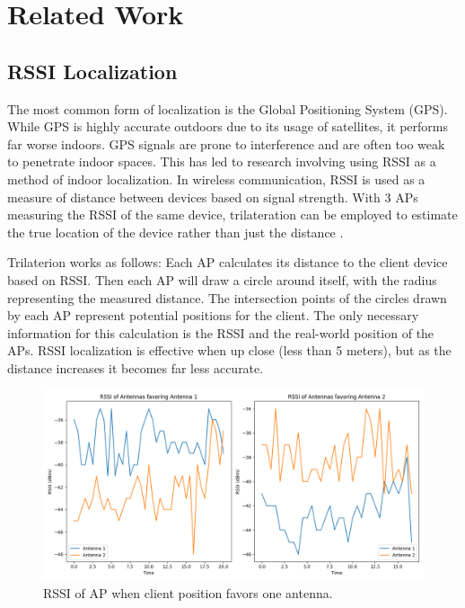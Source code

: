 \section{Related Work}
\subsection{RSSI Localization}
The most common form of localization is the Global Positioning System (GPS). While GPS is highly accurate outdoors due to its usage of satellites, it performs far worse indoors. GPS signals are prone to interference and are often too weak to penetrate indoor spaces.  This has led to research involving using RSSI as a method of indoor localization. In wireless communication, RSSI is used as a measure of distance between devices based on signal strength. With 3 APs measuring the RSSI of the same device, trilateration can be employed to estimate the true location of the device rather than just the distance \cite{rssiLocalization}.

Trilaterion works as follows: Each AP calculates its distance to the client device based on RSSI. Then each AP will draw a circle around itself, with the radius representing the measured distance. The intersection points of the circles drawn by each AP represent potential positions for the client. The only necessary information for this calculation is the RSSI and the real-world position of the APs. RSSI localization is effective when up close (less than 5 meters), but as the distance increases it becomes far less accurate. 



\begin{figure}[tp]
\centering
\includegraphics[width=\textwidth]{figures/antennas_comparison}
\caption{RSSI of AP when client position favors one antenna.}
\label{fig:antennas_comparison}
\end{figure}


